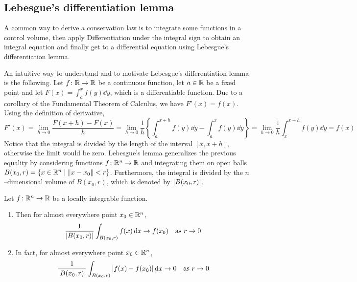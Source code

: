 \subsection{Lebesgue's differentiation lemma}

A common way to derive a conservation law is to integrate some functions in a
control volume, then apply Differentiation under the integral sign to obtain an
integral equation and finally get to a differential equation using Lebesgue's
differentiation lemma. 

An intuitive way to understand and to motivate Lebesgue's differentiation lemma
is the following. Let $f \colon \mathbb{R} \to \mathbb{R}$ be a continuous function, let
$a \in \mathbb{R}$ be a fixed point and let $F(x) = \int_a^x f(y) \dd{y}$, which is a
differentiable function. Due to a corollary of the Fundamental Theorem of
Calculus, we have $F'(x) = f(x)$. Using the definition of derivative,
\[
	F'(x) = 
	\lim_{h \to 0} \frac{F(x + h) - F(x)}{h} = 
	\lim_{h \to 0} \frac{1}{h} \left\{ \int_a^{x + h} f(y) \dd{y} - \int_a^{x} f(y) \dd{y} \right\} = 
	\lim_{h \to 0} \frac{1}{h} \int_x^{x + h} f(y) \dd{y} = f(x)
\]
Notice that the integral is divided by the length of the interval $[x, x+h]$,
otherwise the limit would be zero. Lebesgue's lemma generalizes the previous
equality by considering functions $f \colon \mathbb{R}^n \to \mathbb{R}$ and integrating
them on open balls $B(x_0, r) = \{ x \in \mathbb{R}^n \mid \norm{x -
x_0} < r\}$. Furthermore, the integral is divided by the $n$--dimensional
volume of $B(x_0, r)$, which is denoted by $\abs{B(x_0, r)}$.

\begin{theorem}
	\label{eq:lebesgue_differentiation_lemma} Let $f \colon \mathbb{R}^n \rightarrow
	\mathbb{R}$ be a locally integrable function.
	\begin{enumerate}[label={(\arabic*)}, topsep=0pt]
		\item Then for almost everywhere point $x_0 \in \mathbb{R}^n$,
		\[
			\frac{1}{\abs{B(x_0, r)}} \int_{B(x_0,r)} f(x) \dd{x} \to f(x_0) 
			\quad \text{as } r \to 0
		\]
		\item In fact, for almost everywhere point $x_0 \in \mathbb{R}^n$,
		\[
			\frac{1}{\abs{B(x_0, r)}} \int_{B(x_0,r)} \abs{f(x) - f(x_0)} \dd{x} \to 0 
			\quad \text{as } r \to 0
		\]		
	\end{enumerate}
\end{theorem}
